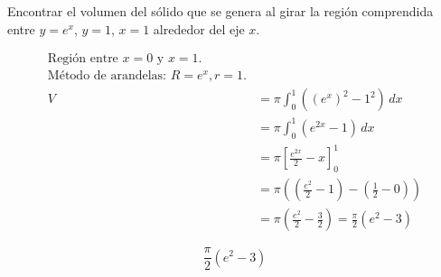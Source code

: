 Encontrar el volumen del sólido que se genera al girar la región comprendida entre $y=e^x$, $y=1$, $x=1$ alrededor del eje $x$.

\nopagebreak
\begin{align*}
\text{Región entre } x=0 \text{ y } x=1. \\
\text{Método de arandelas: } R = e^x, r = 1. \\
V &= \pi \int_{0}^{1} ((e^x)^2 - 1^2) \, dx \\
&= \pi \int_{0}^{1} (e^{2x} - 1) \, dx \\
&= \pi \left[ \frac{e^{2x}}{2} - x \right]_{0}^{1} \\
&= \pi \left( (\frac{e^2}{2} - 1) - (\frac{1}{2} - 0) \right) \\
&= \pi \left( \frac{e^2}{2} - \frac{3}{2} \right) = \frac{\pi}{2}(e^2 - 3)
\end{align*}

\[
\boxed{\displaystyle \frac{\pi}{2}(e^2 - 3)}
\]

